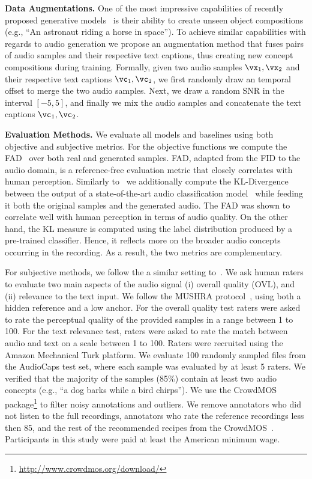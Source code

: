 {\noindent \bf{Data Augmentations.}} One of the most impressive capabilities of recently proposed generative models~\citep{ramesh2022hierarchical, imagen, gafni2022make} is their ability to create unseen object compositions (e.g., ``An astronaut riding a horse in space''). To achieve similar capabilities with regards to audio generation we propose an augmentation method that fuses pairs of audio samples and their respective text captions, thus creating new concept compositions during training. Formally, given two audio samples $\vx_1, \vx_2$ and their respective text captions $\vc_1, \vc_2$, we first randomly draw an temporal offset to merge the two audio samples. Next, we draw a random \ac{SNR} in the interval $[-5,5]$, and finally we mix the audio samples and concatenate the text captions $\vc_1, \vc_2$.

{\noindent \bf{Evaluation Methods.}}
We evaluate all models and baselines using both objective and subjective metrics. For the objective functions we compute the \ac{FAD}~\citep{Kilgour2019FrchetAD} over both real and generated samples. \ac{FAD}, adapted from the \ac{FID} to the audio domain, is a reference-free evaluation metric that closely correlates with human perception. Similarly to~\citet{yang2022diffsound} we additionally compute the KL-Divergence between the output of a state-of-the-art audio classification model~\citep{koutini2021efficient} while feeding it both the original samples and the generated audio.
The FAD was shown to correlate well with human perception in terms of audio quality. On the other hand, the KL measure is computed using the label distribution produced by a pre-trained classifier. Hence, it reflects more on the broader audio concepts occurring in the recording. As a result, the two metrics are complementary. 

For subjective methods, we follow the a similar setting to~\citep{yang2022diffsound}. We ask human raters to evaluate two main aspects of the audio signal (i) overall quality (OVL), and (ii) relevance to the text input. We follow the MUSHRA protocol~\citep{series2014method}, using both a hidden reference and a low anchor. For the overall quality test raters were asked to rate the perceptual quality of the provided samples in a range between 1 to 100. For the text relevance test, raters were asked to rate the match between audio and text on a scale between 1 to 100. Raters were recruited using the Amazon Mechanical Turk platform. We evaluate 100 randomly sampled files from the AudioCaps test set, where each sample was evaluated by at least 5 raters. We verified that the majority of the samples (85\%) contain at least two audio concepts (e.g., ``a dog barks while a bird chirps''). We use the CrowdMOS package\footnote{\url{http://www.crowdmos.org/download/}} to filter noisy annotations and outliers. We remove annotators who did not listen to the full recordings, annotators who rate the reference recordings less then 85, and the rest of the recommended recipes from the CrowdMOS~\citep{ribeiro2011crowdmos}. Participants in this study were paid at least the American minimum wage.

